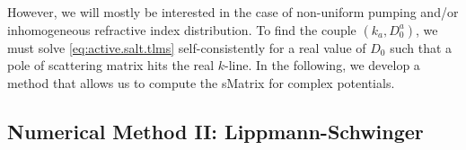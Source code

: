 However, we will mostly be interested in the case of non-uniform pumping
and/or inhomogeneous refractive index distribution. To find the couple
$(k_a,D_0^a)$, we must solve \eqref{eq:active.salt.tlms} self-consistently
for a real value of $D_0$ such that a pole of scattering matrix hits 
the real $k$-line. In the following, we develop a method that allows
us to compute the \gls{sMatrix} for complex potentials.

\subsection{Numerical Method II: Lippmann-Schwinger}
%
%
